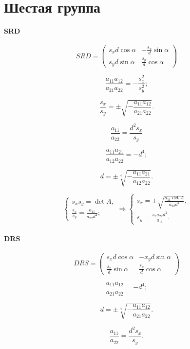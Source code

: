 \section{Шестая группа}

\paragraph{SRD}

$$SRD =
\begin{pmatrix}
	s_x d \cos\alpha & -\frac{s_x}{d}\sin\alpha \\
	s_y d \sin\alpha & \frac{s_y}{d}\cos\alpha
\end{pmatrix}$$

$$\frac{a_{11} a_{12}}{a_{21} a_{22}} = - \frac{s_x^2}{s_y^2};$$

$$\frac{s_x}{s_y} = \pm \sqrt{-\frac{a_{11} a_{12}}{a_{21} a_{22}}}.$$

$$\frac{a_{11}}{a_{22}} = \frac{d^2 s_x}{s_y}$$

$$\frac{a_{11} a_{21}}{a_{12} a_{22}} = -d^4;$$

$$d = \pm \sqrt[4]{-\frac{a_{11} a_{21}}{a_{12} a_{22}}}.$$

$$\begin{cases}
	s_x s_y = \det A,\\
	\frac{s_x}{s_y} = \frac{a_{11}}{a_{22} d^2};
\end{cases}
\Rightarrow
\begin{cases}
	s_x = \pm \sqrt{\frac{a_{11} \det A}{a_{22} d^2}},\\
	s_y = \frac{s_x a_{22} d^2}{a_{11}}.
\end{cases}
$$

\paragraph{DRS}
$$DRS = 
\begin{pmatrix}
	s_x d \cos\alpha & - x_y d \sin\alpha \\
	\frac{s_x}{d} \sin\alpha & \frac{s_y}{d} \cos\alpha
\end{pmatrix}$$

$$\frac{a_{11} a_{12}}{a_{21} a_{22}} = - d^4;$$

$$d = \pm \sqrt[4]{-\frac{a_{11} a_{12}}{a_{21} a_{22}} }.$$

$$\frac{a_{11}}{a_{22}} = \frac{d^2 s_x}{s_y}.$$